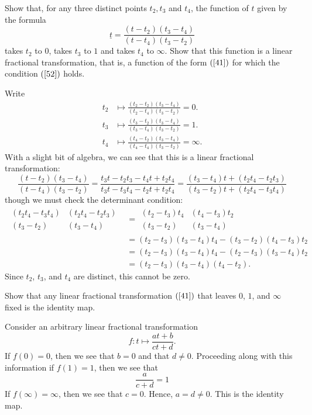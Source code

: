 \documentclass{ximera}
\begin{document}
\begin{problem}
\label{59}Show that, for any three distinct points $t_{2},t_{3}$ and $t_{4}$,
the function of $t$ given by the formula%
\[
\underline{t}
=\frac{(t-t_2)(t_3-t_4)}{(t-t_4)(t_3-t_2)}
\]
takes $t_{2}$ to $0$, takes $t_{3}$ to $1$ and takes $t_{4}$ to
$\infty$. Show that this function is a linear fractional
transformation, that is, a function of the form
$\left( \ref{41}\right) $ for which the condition $\left(
\ref{52}\right)$ holds.
\begin{freeResponse}
Write
\begin{align*}
t_2 &\mapsto \frac{(t_2-t_2)(t_3-t_4)}{(t_2-t_4)(t_3-t_2)} = 0.\\
t_3 &\mapsto \frac{(t_3-t_{2})(t_{3}-t_{4})}{(t_3-t_{4})(t_{3}-t_{2})}= 1.\\
t_4 &\mapsto \frac{(t_4-t_{2})(t_{3}-t_{4})}{(t_4-t_{4})(t_{3}-t_{2})} = \infty.
\end{align*}
With a slight bit of algebra, we can see that this is a linear fractional transformation:
\[
\frac{(t-t_{2})(t_{3}-t_{4})}{(t-t_{4})(t_{3}-t_{2})} = \frac{t_3t - t_2t_3-t_4t +t_2t_4}{t_3t-t_3t_4-t_2t+t_2t_4} = \frac{(t_3-t_4)t + (t_2t_4-t_2t_3)}{(t_3-t_2)t + (t_2t_4-t_3t_4)}
\]
though we must check the determinant condition:
\begin{align*}
\begin{array}{|cc|}
(t_2t_4 - t_3t_4) & (t_2t_4 - t_2t_3) \\
(t_3-t_2) & (t_3-t_4)
\end{array}
&=
\begin{array}{|cc|}
(t_2 - t_3)t_4 & (t_4 - t_3)t_2 \\
(t_3-t_2) & (t_3-t_4)
\end{array}\\
&=(t_2-t_3)(t_3-t_4)t_4 - (t_3-t_2)(t_4-t_3)t_2\\
&= (t_2-t_3)(t_3-t_4)t_4 - (t_2-t_3)(t_3-t_4)t_2\\
&= (t_2-t_3)(t_3-t_4)(t_4 -t_2).
\end{align*}
Since $t_2$, $t_3$, and $t_4$ are distinct, this cannot be
zero.
\end{freeResponse}
\end{problem}





\begin{problem}
\label{57}Show that any linear fractional transformation $\left(
\ref{41}\right)$ that leaves $0$, $1$, and $\infty$ fixed is the identity map.
\begin{freeResponse}
Consider an arbitrary linear fractional transformation
\[
f:t \mapsto \frac{at +b}{ct+d}.
\]
If $f(0)=0$, then we see that $b=0$ and that $d\ne 0$. Proceeding
along with this information if $f(1) = 1$, then we see that
\[
\frac{a}{c+d} = 1
\]
If $f(\infty) = \infty$, then we see that $c=0$. Hence, $a=d\ne
0$. This is the identity map.  \end{freeResponse}
\end{problem}
\end{document}
